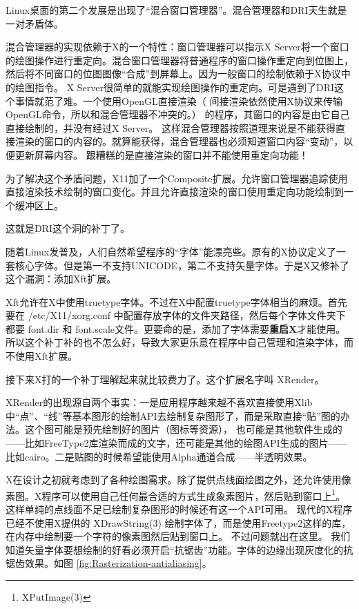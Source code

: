 Linux桌面的第二个发展是出现了“混合窗口管理器”。混合管理器和DRI天生就是一对矛盾体。

\begin{insertnote}

混合管理器的实现依赖于X的一个特性：窗口管理器可以指示X Server将一个窗口的绘图操作进行重定向。混合窗口管理器将普通程序的窗口操作重定向到位图上，然后将不同窗口的位图图像“合成”到屏幕上。因为一般窗口的绘制依赖于X协议中的绘图指令。
X Server很简单的就能实现绘图操作的重定向。可是遇到了DRI这个事情就范了难。一个使用OpenGL直接渲染（ 间接渲染依然使用X协议来传输OpenGL命令，所以和混合管理器不冲突的。）
的程序，其窗口的内容是由它自己直接绘制的，并没有经过X Server。 这样混合管理器按照道理来说是不能获得直接渲染的窗口的内容的。就算能获得，混合管理器也必须知道窗口内容“变动”，以便更新屏幕内容。
跟糟糕的是直接渲染的窗口并不能使用重定向功能！
\end{insertnote}

为了解决这个矛盾问题，X11加了一个Composite扩展。允许窗口管理器追踪使用直接渲染技术绘制的窗口变化。并且允许直接渲染的窗口使用重定向功能绘制到一个缓冲区上。

这就是DRI这个洞的补丁了。

随着Linux发普及，人们自然希望程序的“字体”能漂亮些。原有的X协议定义了一套核心字体。但是第一不支持UNICODE，第二不支持矢量字体。于是X又修补了这个漏洞：添加Xft扩展。

Xft允许在X中使用truetype字体。不过在X中配置truetype字体相当的麻烦。首先要在 /etc/X11/xorg.conf 中配置存放字体的文件夹路径，然后每个字体文件夹下都要 font.dir 和 font.scale文件。更要命的是，添加了字体需要\textbf{重启X}才能使用。所以这个补丁补的也不怎么好，导致大家更乐意在程序中自己管理和渲染字体，而不使用Xft扩展。

接下来X打的一个补丁理解起来就比较费力了。这个扩展名字叫 XRender。

XRender的出现源自两个事实：一是应用程序越来越不喜欢直接使用Xlib中“点”、“线”等基本图形的绘制API去绘制复杂图形了，而是采取直接“贴”图的办法。这个图可能是预先绘制好的图片（图标等资源），
也可能是其他软件生成的——比如FreeType2库渲染而成的文字，还可能是其他的绘图API生成的图片——比如cairo。二是贴图的时候希望能使用Alpha通道合成——半透明效果。

X在设计之初就考虑到了各种绘图需求。除了提供点线面绘图之外，还允许使用像素图。X程序可以使用自己任何最合适的方式生成象素图片，然后贴到窗口上\footnote{XPutImage(3)}。
这样单纯的点线面不足已绘制复杂图形的时候还有这一个API可用。
现代的X程序已经不使用X提供的 XDrawString(3) 绘制字体了，而是使用Freetype2这样的库，在内存中绘制要一个字符的像素图然后贴到窗口上。
不过问题就出在这里。
我们知道矢量字体要想绘制的好看必须开启“抗锯齿”功能。字体的边缘出现灰度化的抗锯齿效果。如图 \ref{fig:Rasterization-antialiasing}。

